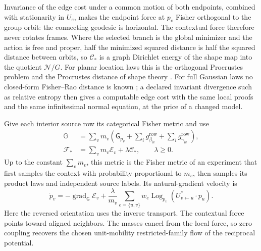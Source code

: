 Invariance of the edge cost under a common motion of both endpoints, combined with stationarity in $U_e$, makes the endpoint force at $p_v$ Fisher orthogonal to the group orbit: the connecting geodesic is horizontal. The contextual force therefore never rotates frames. Where the selected branch is the global minimizer and the action is free and proper, half the minimized squared distance is half the squared distance between orbits, so $\mathcal C_*$ is a graph Dirichlet energy of the shape map into the quotient $\mathcal N/G$. For planar location laws this is the orthogonal Procrustes problem \citep{Schonemann1966} and the Procrustes distance of shape theory \citep{Kendall1984}. For full Gaussian laws no closed-form Fisher--Rao distance is known \citep{PineleStrapassonCosta2020}; a declared invariant divergence such as relative entropy then gives a computable edge cost with the same local proofs and the same infinitesimal normal equation, at the price of a changed model.

Give each interior source row its categorical Fisher metric and use
\begin{equation}
 \begin{aligned}
 \mathbb G&=\sum_v m_v\left(\mathsf G_{p_v}
                      +\sum_i g^{\mathrm{row}}_{\beta_{iv}}+\sum_i g^{\mathrm{row}}_{\gamma_{iv}}\right),\\
 \mathcal F_*&=\sum_v m_v\mathcal E_v+\lambda\mathcal C_*,\qquad\lambda\geq0.
 \end{aligned}
 \label{comp:ctx:finite-total}
\end{equation}
Up to the constant $\sum_vm_v$, this metric is the Fisher metric of an experiment that first samples the context with probability proportional to $m_v$, then samples its product laws and independent source labels. Its natural-gradient velocity \citep{Amari1998} is
\begin{equation}
 \dot p_v=-\operatorname{grad}_{\mathsf G}\mathcal E_v
 +\frac{\lambda}{m_v}\sum_{e=\{u,v\}}w_e
       \operatorname{Log}_{p_v}(U^*_{v\leftarrow u}\cdot p_u).
 \label{comp:ctx:finite-flow}
\end{equation}
Here the reversed orientation uses the inverse transport. The contextual force points toward aligned neighbors. The masses cancel from the local force, so zero coupling recovers the chosen unit-mobility restricted-family flow of the reciprocal potential.

